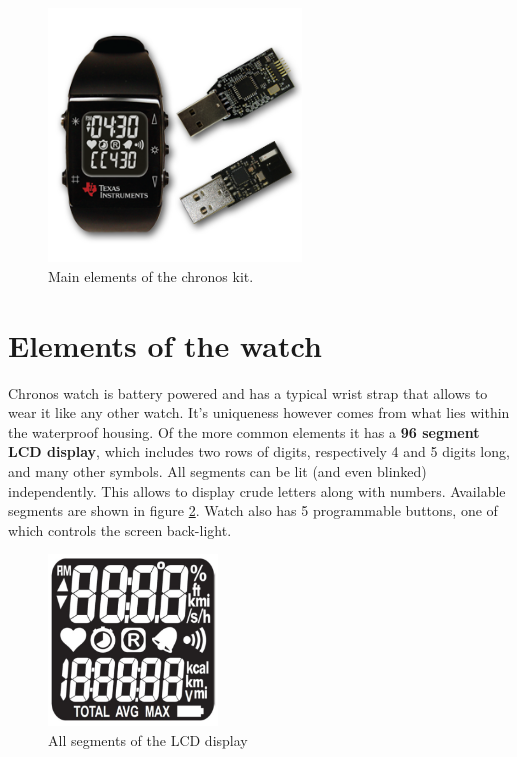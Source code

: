 \begin{figure}[h]
  \centering
  \includegraphics[width=0.6\textwidth]{img/chronos_watch.png}
  \caption{Main elements of the chronos kit.}
  \label{fig:chronos_watch}
\end{figure}

\section{Elements of the watch}
Chronos watch is battery powered and has a typical wrist strap that
allows to wear it like any other watch. It's uniqueness however comes
from what lies within the waterproof housing. Of the more common
elements it has a {\bf 96 segment LCD display}, which includes two
rows of digits, respectively 4 and 5 digits long, and many other
symbols. All segments can be lit (and even blinked) independently.
This allows to display crude letters along with numbers. Available
segments are shown in figure \ref{fig:chronos_segs}.  Watch also has 5
programmable buttons, one of which controls the screen back-light.

\begin{figure}[h]
  \centering
  \includegraphics[width=0.4\textwidth]{img/chronos_segs.png}
  \caption{All segments of the LCD display}
  \label{fig:chronos_segs}
\end{figure}

